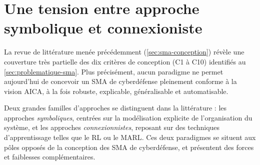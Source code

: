 \section{Une tension entre approche symbolique et connexioniste}\label{sec:limits-existing}

La revue de littérature menée précédemment (\autoref{sec:sma-conception}) révèle une couverture très partielle des dix critères de conception (C1 à C10) identifiés au \autoref{sec:problematique-sma}. Plus précisément, aucun paradigme ne permet aujourd'hui de concevoir un \ac{SMA} de cyberdéfense pleinement conforme à la vision \ac{AICA}, à la fois robuste, explicable, généralisable et automatisable.

Deux grandes familles d'approches se distinguent dans la littérature : les approches \textit{symboliques}, centrées sur la modélisation explicite de l'organisation du système, et les approches \textit{connexionnistes}, reposant sur des techniques d'apprentissage telles que le \ac{RL} ou le \ac{MARL}. Ces deux paradigmes se situent aux pôles opposés de la conception des \ac{SMA} de cyberdéfense, et présentent des forces et faiblesses complémentaires.

